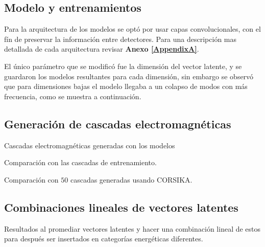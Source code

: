 \subsection*{Modelo y entrenamientos}

Para la arquitectura de los modelos se optó por usar capas convolucionales, con el fín de preservar la información entre detectores. Para una descripción mas detallada de cada arquitectura revisar \textbf{Anexo \ref{AppendixA}}.

El único parámetro que se modificó fue la dimensión del vector latente, y se guardaron los modelos resultantes para cada dimensión, sin embargo se observó que para dimensiones bajas el modelo llegaba a un colapso de modos con más frecuencia, como se muestra a continuación.

\subsection*{Generación de cascadas electromagnéticas}

Cascadas electromagnéticas generadas con los modelos 

Comparación con las cascadas de entrenamiento.

Comparación con $50$ cascadas generadas usando CORSIKA.

\subsection*{Combinaciones lineales de vectores latentes}

Resultados al promediar vectores latentes y hacer una combinación lineal de estos para después ser insertados en categorías energéticas diferentes.

